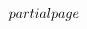 $$\def\@finishleftmargin{%
  \dimen2 = \hoffset		%
  \hoffset = \dimen0 \advance\hoffset by -1in
  \advance\dimen2 by -\hoffset	%
  \advance\hsize by \dimen2	%
}%
\def\advanceleftmargin{%
  \dimen0 = 0pt \afterassignment\@finishadvanceleftmargin \advance\dimen0
}%
\def\@finishadvanceleftmargin{%
  \advance\hoffset by \dimen0
  \advance\hsize by -\dimen0
}%
\def\rightmargin{\afterassignment\@finishrightmargin \dimen0}%
\def\@finishrightmargin{%
  \@computerightmargin		%
  \advance\dimen2 by -\dimen0	%
  \advance\hsize by \dimen2	%
}%
\def\advancerightmargin{%
  \dimen0 = 0pt \afterassignment\@finishadvancerightmargin \advance\dimen0
}%
\def\@finishadvancerightmargin{%
  \advance\hsize by -\dimen0
}%
\def\@computerightmargin{%
  \dimen2 = \paperwidth		%
  \advance\dimen2 by -\hsize	%
  \advance\dimen2 by -\hoffset	%
  \advance\dimen2 by -1in	%
}%
\newskip\abovedoublecolumnskip \abovedoublecolumnskip = \bigskipamount
\newskip\belowdoublecolumnskip \belowdoublecolumnskip = \bigskipamount
\newdimen\gutter \gutter = 2pc
\newdimen\doublecolumnhsize
\newbox\@partialpage \newdimen\singlecolumnhsize \newdimen\singlecolumnvsize
\newtoks\previousoutput
\def\doublecolumns{%
   \doublecolumnhsize = \hsize   %
   \par   %
   \previousoutput = \expandafter{\the\output}%
   \advance\doublecolumnhsize by -\gutter
   \divide\doublecolumnhsize by 2
   \output = {%
      \global\setbox\@partialpage =
         \vbox{\unvbox255\vskip\abovedoublecolumnskip}%
   }%
   \pagegoal = \pagetotal
   \break %
   \output = {\doublecolumnoutput}%
   \singlecolumnhsize = \hsize
   \singlecolumnvsize = \vsize
   \hsize = \doublecolumnhsize
   \vsize = 2\vsize
}%
\def\@doublecolumnsplit{%
   \splittopskip = \topskip
   \splitmaxdepth = \maxdepth
   \dimen0 = \singlecolumnvsize
      \advance\dimen0 by -\ht\@partialpage
      \advance\dimen0 by -\ht\footins
      \ifvoid\footins\else \advance\dimen0 by -\skip\footins \fi
      \advance\dimen0 by -\ht\topins
      \ifvoid\topins\else \advance\dimen0 by -\skip\topins \fi
   \begingroup
      \vbadness = 10000
      \global\setbox1 = \vsplit255 to \dimen0
      \wd1 = \hsize
      \global\setbox3 = \vsplit255 to \dimen0
      \wd3 = \hsize	
}$$
